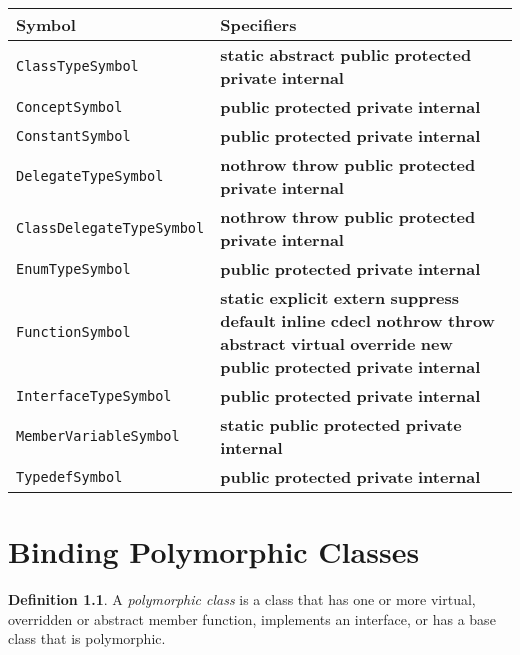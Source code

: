 \documentclass[a4paper,oneside,11pt]{book}
\theoremstyle{definition}
\newtheorem{defn}{Definition}[section]
\begin{document}
\begin{flushleft}
\begin{supertabular}{lp{10cm}}
\textbf{Symbol}& \textbf{Specifiers}\\
\hline
\verb|ClassTypeSymbol|& \textbf{static} \textbf{abstract} \textbf{public} \textbf{protected} \textbf{private} \textbf{internal}\\
\verb|ConceptSymbol|& \textbf{public} \textbf{protected} \textbf{private} \textbf{internal}\\
\verb|ConstantSymbol|& \textbf{public} \textbf{protected} \textbf{private} \textbf{internal}\\
\verb|DelegateTypeSymbol|& \textbf{nothrow} \textbf{throw} \textbf{public} \textbf{protected} \textbf{private} \textbf{internal}\\
\verb|ClassDelegateTypeSymbol|& \textbf{nothrow} \textbf{throw} \textbf{public} \textbf{protected} \textbf{private} \textbf{internal}\\
\verb|EnumTypeSymbol|& \textbf{public} \textbf{protected} \textbf{private} \textbf{internal}\\
\verb|FunctionSymbol|&
\textbf{static} \textbf{explicit} \textbf{extern} \textbf{suppress} \textbf{default} \textbf{inline} \textbf{cdecl} \textbf{nothrow} \textbf{throw}
\textbf{abstract} \textbf{virtual} \textbf{override} \textbf{new}
\textbf{public} \textbf{protected} \textbf{private} \textbf{internal}\\
\verb|InterfaceTypeSymbol|& \textbf{public} \textbf{protected} \textbf{private} \textbf{internal}\\
\verb|MemberVariableSymbol|& \textbf{static} \textbf{public} \textbf{protected} \textbf{private} \textbf{internal}\\
\verb|TypedefSymbol|& \textbf{public} \textbf{protected} \textbf{private} \textbf{internal}\\
\hline
\end{supertabular}
\end{flushleft}

\chapter{Binding Polymorphic Classes}\label{bindingvirtualclasses}

\begin{defn}\label{virtualclass} A \emph{polymorphic class} is a class that has one or more virtual, overridden or abstract member function, implements an interface,
or has a base class that is polymorphic.
\end{defn}
\end{document}

